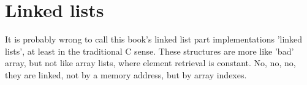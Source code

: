 \part{Linked lists} \label{pt:two}

\indent It is probably wrong to call this book's linked list part implementations 'linked lists', at least in the traditional C sense. These structures are more like 'bad' array, but not like array lists, where element retrieval is constant. No, no, no, they are linked, not by a memory address, but by array indexes.
